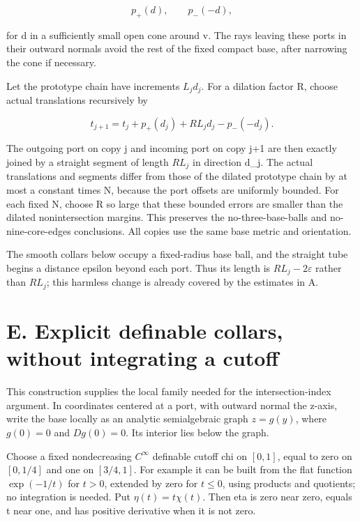 \documentclass[11pt,a4paper]{article}
\begin{document}
\[
 p_+(d),\qquad p_-(-d),
\]

for d in a sufficiently small open cone around v. The rays leaving these
ports in their outward normals avoid the rest of the fixed compact base,
after narrowing the cone if necessary.

Let the prototype chain have increments \(L_j d_j\). For a dilation
factor R, choose actual translations recursively by

\[
 t_{j+1}=t_j+p_+(d_j)+R L_jd_j-p_-(-d_j).
 \tag{D1}
\]

The outgoing port on copy j and incoming port on copy j+1 are then
exactly joined by a straight segment of length \(R L_j\) in direction
d\_j. The actual translations and segments differ from those of the
dilated prototype chain by at most a constant times N, because the port
offsets are uniformly bounded. For each fixed N, choose R so large that
these bounded errors are smaller than the dilated nonintersection
margins. This preserves the no-three-base-balls and no-nine-core-edges
conclusions. All copies use the same base metric and orientation.

The smooth collars below occupy a fixed-radius base ball, and the
straight tube begins a distance epsilon beyond each port. Thus its
length is \(R L_j-2\varepsilon\) rather than \(R L_j\); this harmless
change is already covered by the estimates in A.

\hypertarget{1022-e.-explicit-definable-collars-without-integrating-a-cutoff}{%
\section{E. Explicit definable collars, without integrating a
cutoff}\label{1022-e.-explicit-definable-collars-without-integrating-a-cutoff}}

This construction supplies the local family needed for the
intersection-index argument. In coordinates centered at a port, with
outward normal the z-axis, write the base locally as an analytic
semialgebraic graph \(z=g(y)\), where \(g(0)=0\) and \(Dg(0)=0\). Its
interior lies below the graph.

Choose a fixed nondecreasing \(C^\infty\) definable cutoff chi on
\([0,1]\), equal to zero on \([0,1/4]\) and one on \([3/4,1]\). For
example it can be built from the flat function \(\exp (-1/t)\) for
\(t>0\), extended by zero for \(t\le 0\), using products and quotients;
no integration is needed. Put \(\eta (t)=t \chi (t)\). Then eta is zero
near zero, equals t near one, and has positive derivative when it is not
zero.
\end{document}

